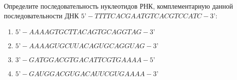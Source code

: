 
Определите последовательность нуклеотидов
РНК, комплементарную данной последовательности ДНК $5’-TTTTCACGAATGTCACGTCCATC-3’$:

\begin{enumerate}
    \item $5’-AAAAGTGCTTACAGTGCAGGTAG-3’$
    \item $5’-AAAAGUGCUUACAGUGCAGGUAG-3’$
    \item $3’-GATGGACGTGACATTCGTGAAAA-5’$
    \item $5’-GAUGGACGUGACAUUCGUGAAAA-3’$
\end{enumerate}

\explanationSection

